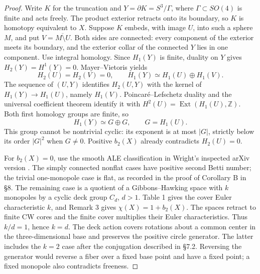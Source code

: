 \documentclass[11pt]{article}
\numberwithin{equation}{section}
\theoremstyle{definition}
\theoremstyle{remark}
\begin{document}
\begin{proof}
Write \(K\) for the truncation and \(Y=\partial K=S^3/\Gamma\),
where \(\Gamma\subset SO(4)\) is finite and acts freely.
The product exterior retracts onto its boundary, so \(K\) is
homotopy equivalent to \(X\). Suppose \(K\) embeds, with image
\(U\), into such a sphere \(M\), and put
\(V=\overline{M\setminus U}\). Both sides are connected: every
component of the exterior meets its boundary, and the exterior
collar of the connected \(Y\) lies in one component.
Use integral homology. Since \(H_1(Y)\) is finite, duality on
\(Y\) gives \(H_2(Y)=H^1(Y)=0\). Mayer--Vietoris yields
\[
 H_2(U)=H_2(V)=0,\qquad
 H_1(Y)\simeq H_1(U)\oplus H_1(V).
\]
The sequence of \((U,Y)\) identifies \(H_2(U,Y)\) with the
kernel of \(H_1(Y)\to H_1(U)\), namely \(H_1(V)\).
Poincar\'e--Lefschetz duality and the universal coefficient theorem
identify it with \(H^2(U)=\operatorname{Ext}(H_1(U),\mathbb Z)\).
Both first homology groups are finite, so
\begin{equation}\label{eq:ale-boundary-double}
 H_1(Y)\simeq G\oplus G,\qquad G=H_1(U).
\end{equation}
This group cannot be nontrivial cyclic: its exponent is at most
\(|G|\), strictly below its order \(|G|^2\) when \(G\ne0\).
Positive \(b_2(X)\) already contradicts \(H_2(U)=0\).

For \(b_2(X)=0\), use the smooth ALE classification in Wright's
inspected arXiv version
\cite[Theorem A, \S2/Table 1, \S3/Remark 3, and \S\S7.1--8]{Wright2012GravitationalInstantonQuotients}.
The simply connected nonflat cases have positive second Betti number;
the trivial one-monopole case is flat, as recorded in the proof of
Corollary B in \S8.
The remaining case is a quotient of a Gibbons--Hawking space with
\(k\) monopoles by a cyclic deck group \(C_d\), \(d>1\).
Table 1 gives the cover Euler characteristic \(k\), and Remark 3
gives \(\chi(X)=1+b_2(X)\). The spaces retract to finite CW
cores and the finite cover multiplies their Euler characteristics.
Thus \(k/d=1\), hence \(k=d\).
The deck action covers rotations about a common center in the
three-dimensional base and preserves the positive circle generator.
The latter includes the \(k=2\) case after the conjugation described
in \S7.2. Reversing the generator would reverse a fiber over a
fixed base point and have a fixed point; a fixed monopole also
contradicts freeness.


\end{proof}
\end{document}
